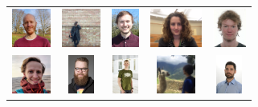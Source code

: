 \documentclass[usenames,dvipsnames,aspectratio=169,12pt]{beamer}
\begin{document}
\begin{frame}
\begin{figure}
\begin{tabular}{ccccc}
    {\includegraphics[height = 0.5in]{jeppe.png}}      &
    {\includegraphics[height = 0.5in]{aina.jpg}}       &
    {\includegraphics[height = 0.5in]{jakob.png}}      &
    {\includegraphics[height = 0.5in]{marit.png}}      &
    {\includegraphics[height = 0.5in]{mathias.jpg}}   \\
    {\includegraphics[height = 0.5in]{simon.jpg}}      &
    {\includegraphics[height = 0.5in]{lau.jpg}}        &
    {\includegraphics[height = 0.5in]{soeren.jpg}}     &
    {\includegraphics[height = 0.5in]{me.jpg}}         &
    {\includegraphics[height = 0.5in]{andreas.jpg}}
    \end{tabular}
  \end{figure}
\end{frame}
\end{document}
